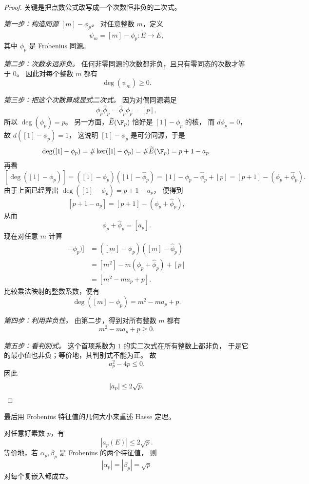 \begin{proof}
关键是把点数公式改写成一个次数恒非负的二次式。

\textit{第一步：构造同源 $[m]-\phi_p$。}
对任意整数 $m$，定义
\[
  \psi_m=[m]-\phi_p\colon \widetilde E\to \widetilde E,
\]
其中 $\phi_p$ 是 Frobenius 同源。

\textit{第二步：次数永远非负。}
任何非零同源的次数都非负，且只有零同态的次数才等于 $0$。
因此对每个整数 $m$ 都有
\[
  \deg(\psi_m)\ge 0.
\]

\textit{第三步：把这个次数算成显式二次式。}
因为对偶同源满足
\[
  \phi_p\hat\phi_p=\hat\phi_p\phi_p=[p],
\]
所以 $\deg(\phi_p)=p$。
另一方面，$\widetilde E(\F_p)$ 恰好是 $[1]-\phi_p$ 的核，
而 $d\phi_p=0$，故 $d([1]-\phi_p)=1$，
这说明 $[1]-\phi_p$ 是可分同源，于是
\[
  \deg([1]-\phi_p)=\#\ker([1]-\phi_p)=\#\widetilde E(\F_p)=p+1-a_p.
\]
再看
\[
  [\deg([1]-\phi_p)]
  =([1]-\phi_p)([1]-\hat\phi_p)
  =[1]-\phi_p-\hat\phi_p+[p]
  =[p+1]-(\phi_p+\hat\phi_p).
\]
由于上面已经算出 $\deg([1]-\phi_p)=p+1-a_p$，
便得到
\[
  [p+1-a_p]=[p+1]-(\phi_p+\hat\phi_p),
\]
从而
\[
  \phi_p+\hat\phi_p=[a_p].
\]
现在对任意 $m$ 计算
\begin{align*}
  [\deg([m]-\phi_p)]
  &=([m]-\phi_p)([m]-\hat\phi_p)\\
  &=[m^2]-m(\phi_p+\hat\phi_p)+[p]\\
  &=[m^2-ma_p+p].
\end{align*}
比较乘法映射的整数系数，便有
\[
  \deg([m]-\phi_p)=m^2-ma_p+p.
\]

\textit{第四步：利用非负性。}
由第二步，得到对所有整数 $m$ 都有
\[
  m^2-ma_p+p\ge 0.
\]

\textit{第五步：看判别式。}
这个首项系数为 $1$ 的实二次式在所有整数上都非负，
于是它的最小值也非负；等价地，其判别式不能为正。
故
\[
  a_p^2-4p\le 0.
\]
因此
\[
  |a_p|\le 2\sqrt p. \qedhere
\]
\end{proof}

最后用 Frobenius 特征值的几何大小来重述 Hasse 定理。

\begin{theorem}[Hasse 界]
\label{thm:ch09-hasse-bound}
对任意好素数 $p$，有
\[
  |a_p(E)|\le 2\sqrt p.
\]
等价地，若 $\alpha_p,\beta_p$ 是 Frobenius 的两个特征值，
则
\[
  |\alpha_p|=|\beta_p|=\sqrt p
\]
对每个复嵌入都成立。
\end{theorem}

